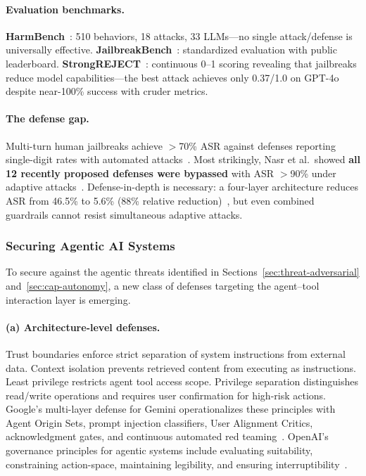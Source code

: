 \paragraph{Evaluation benchmarks.}
\textbf{HarmBench}~\cite{mazeika2024harmbench}: 510 behaviors, 18 attacks, 33 LLMs---no single attack/defense is universally effective. \textbf{JailbreakBench}~\cite{chao2024jailbreakbench}: standardized evaluation with public leaderboard. \textbf{StrongREJECT}~\cite{souly2024strongreject}: continuous 0--1 scoring revealing that jailbreaks reduce model capabilities---the best attack achieves only 0.37/1.0 on GPT-4o despite near-100\% success with cruder metrics.

\paragraph{The defense gap.}
Multi-turn human jailbreaks achieve $>$70\% ASR against defenses reporting single-digit rates with automated attacks~\cite{li2024multiturn}. Most strikingly, Nasr et al.\ showed \textbf{all 12 recently proposed defenses were bypassed} with ASR $>$90\% under adaptive attacks~\cite{nasr2025attacker}. Defense-in-depth is necessary: a four-layer architecture reduces ASR from 46.5\% to 5.6\% (88\% relative reduction)~\cite{dong2024hierarchical}, but even combined guardrails cannot resist simultaneous adaptive attacks.


\subsubsection{Securing Agentic AI Systems}
\label{sec:agentic-security}

To secure against the agentic threats identified in Sections~\ref{sec:threat-adversarial} and~\ref{sec:cap-autonomy}, a new class of defenses targeting the agent--tool interaction layer is emerging.

\paragraph{(a) Architecture-level defenses.}
Trust boundaries enforce strict separation of system instructions from external data. Context isolation prevents retrieved content from executing as instructions. Least privilege restricts agent tool access scope. Privilege separation distinguishes read/write operations and requires user confirmation for high-risk actions. Google's multi-layer defense for Gemini operationalizes these principles with Agent Origin Sets, prompt injection classifiers, User Alignment Critics, acknowledgment gates, and continuous automated red teaming~\cite{google2025geminidefense}. OpenAI's governance principles for agentic systems include evaluating suitability, constraining action-space, maintaining legibility, and ensuring interruptibility~\cite{shavit2024agenticgovernance}.

